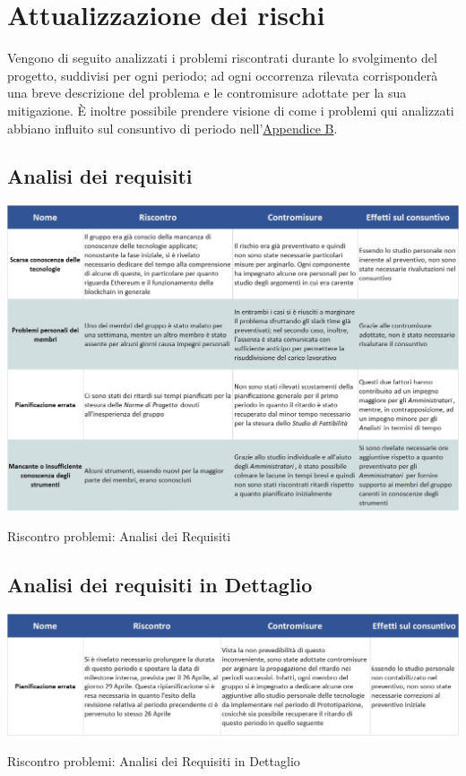 \newpage

\section{Attualizzazione dei rischi} \label{RiscontroRischi}

Vengono di seguito analizzati i problemi riscontrati durante lo svolgimento del progetto, suddivisi per ogni periodo; ad ogni occorrenza rilevata corrisponderà una breve descrizione del problema e le contromisure adottate per la sua mitigazione. È inoltre possibile prendere visione di come i problemi qui analizzati abbiano influito sul consuntivo di periodo nell'\hyperref[ConsuntivoPeriodo]{Appendice B}.\\

\subsection{Analisi dei requisiti}
\begin{table}[h!]
	\centerline{\includegraphics[scale=0.55]{img/Rischi/RiscontroProblemi-AnalisiRequisiti.jpg}}
	\caption{Riscontro problemi: Analisi dei Requisiti}
\end{table}
\clearpage

\subsection{Analisi dei requisiti in Dettaglio} \label{RiscontroAnalisiDettaglio}
\begin{table}[h!]
	\centerline{\includegraphics[scale=0.55]{img/Rischi/RiscontroProblemi-AnalisiRequisitiDettaglio.jpg}}
	\caption{Riscontro problemi: Analisi dei Requisiti in Dettaglio}
\end{table}

